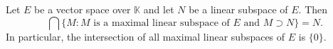Let $E$ be a vector space over $\mathbb{K}$ and let $N$ be a linear subspace of $E$. Then
$$\bigcap\{M : M \text{ is a maximal linear subspace of } E \text{ and } M \supset N\} = N.$$
In particular, the intersection of all maximal linear subspaces of $E$ is $\{0\}$.

